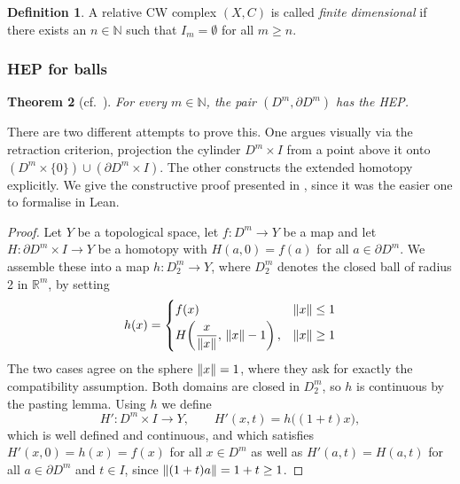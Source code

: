 \documentclass[11pt, a4paper, english]{article}
\DeclarePairedDelimiter\norm{\lVert}{\rVert}
\theoremstyle{plain}
\newtheorem{theorem}{Theorem}
\theoremstyle{definition}
\newtheorem{definition}[theorem]{Definition}
\theoremstyle{remark}
\numberwithin{equation}{section}
\numberwithin{theorem}{section}
\begin{document}
\begin{definition}
    A relative CW complex $(X,C)$ is called \emph{finite dimensional} if there exists an $n \in \mathbb{N}$ such that $I_m = \emptyset$ for all $ m \ge n$.
\end{definition}

\subsubsection{HEP for balls} \label{subsubsec:HEP_ball}
\begin{theorem} [cf.\ {\cite[Lemma 11]{JHU}}] \label{thm:HEPball}
    For every $m \in \mathbb{N}$, the pair $(D^m, \partial D^m)$ has the HEP.
\end{theorem}

There are two different attempts to prove this. One argues visually via the retraction criterion, projection the cylinder $D^m \times I$ from a point above it onto $(D^m \times \{0\}) \cup (\partial D^m \times I)$. The other constructs the extended homotopy explicitly. We give the constructive proof presented in {\cite[Lemma 11]{JHU}}, since it was the easier one to formalise in Lean.

\begin{proof}
    Let $Y$ be a topological space, let $f \colon D^m \to Y$ be a map and let $H \colon \partial D^m \times I \to Y$ be a homotopy with $H(a,0) = f(a)$ for all $a \in \partial D^m$. We assemble these into a map $ h \colon D_2^m \to Y $, where $D_2^m $ denotes the closed ball of radius 2 in $ \mathbb{R} ^m $, by setting
\[
    h (x) = 
    \begin{cases}
        f(x) & \norm{x}  \leq 1 \\[2pt]
        H\!\left(\dfrac{x}{\norm{x}},\, \norm{x} - 1\right), & \norm{x} \ge 1  
    \end{cases}
\] 
    The two cases agree on the sphere $\norm{x} = 1$, where they ask for exactly the compatibility assumption. Both domains are closed in $D_2^m$, so $h$ is continuous by the pasting lemma. Using $h$ we define
    \[
        H' \colon D^m \times I \to Y, \qquad H'(x,t) = h\big((1+t)x\big),
    \]
    which is well defined and continuous, and which satisfies $H'(x,0) = h(x) = f(x)$ for all $x \in D^m$ as well as $H'(a,t) = H(a,t)$ for all $a \in \partial D^m$ and $t \in I$, since $\norm{(1+t)a} = 1+t \ge 1$.
\end{proof}
\end{document}
